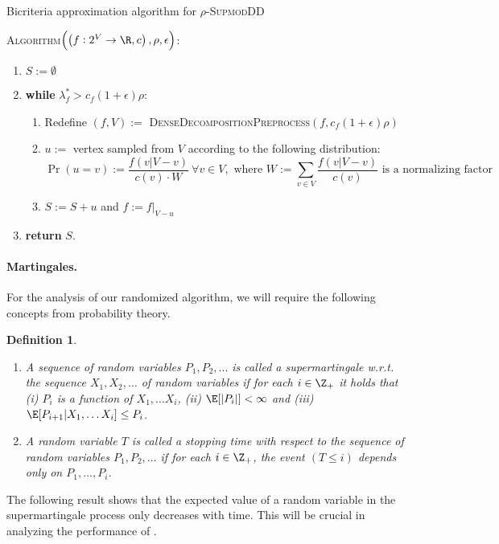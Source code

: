 \documentclass{article}
\newtheorem{definition}{Definition}[section]
\newcommand{\supmoddensitydeletionset}{\textsc{SupmodDD}\xspace}
\begin{document}
\begin{algorithm}
\caption{Bicriteria approximation algorithm for $\rho$-\supmoddensitydeletionset}\label{alg:bicriteria-iterative-random-deletion}
\textsc{Algorithm}$\left(\left(f:2^V\rightarrow\R ,c\right), \rho, \epsilon\right)$:
\begin{enumerate}
\item $S := \emptyset$
\item \textbf{while} $\lambda_f^* > c_f (1+\epsilon)\rho$:
\begin{enumerate}[nosep]
        \item Redefine $(f, V) := $ \textsc{DenseDecompositionPreprocess}$(f, c_f (1+\epsilon)\rho)$
        \item $u :=$ vertex sampled from $V$ according to the following distribution: $$\Pr(u = v) := \frac{f(v|V-v)}{c(v)\cdot W} \ \forall v \in V, \text{ where $W := \sum_{v \in V}\frac{f(v|V-v)}{c(v)}$ is a normalizing factor}$$
        \item $S := S+u$ and $f := f|_{V - u}$
    \end{enumerate}
    \item \textbf{return} $S$. 
\end{enumerate}
\end{algorithm}

\paragraph{Martingales. } For the analysis of our randomized algorithm, we will require the following concepts from probability theory.
\begin{definition} 
\begin{enumerate}
    \item 
    A sequence of random variables $P_1, P_2, ...$ is called a \emph{supermartingale} w.r.t. the sequence $X_1, X_2, \ldots $ of random variables if for each $i \in \Z_+$ it holds that (i) $P_i$ is a function of $X_1, \ldots X_i$,
    (ii) $\E[|P_i|] < \infty$  and (iii) $\E[P_{i+1} | X_1, \ldots X_i] \leq P_i$. 
    \item A random variable $T$ is called a \emph{stopping time} with respect to the sequence of random variables $P_1, P_2, ...$  if for each $i \in \Z_+$, the event $(T \leq i)$ depends only on $P_1, \ldots, P_i$.
    \end{enumerate}
\end{definition}

The following result shows that the expected value of a random variable in the supermartingale process only decreases with time. This will be crucial in analyzing the performance of .
\end{document}
